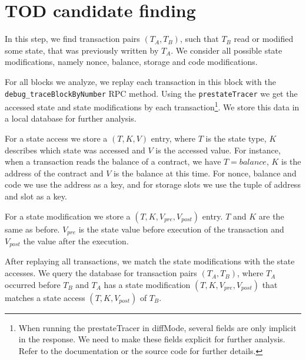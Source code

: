 \documentclass[draft,final]{vutinfth} %
\begin{document}

\section{TOD candidate finding}

In this step, we find transaction pairs $(T_A, T_B)$, such that $T_B$ read or modified some state, that was previously written by $T_A$. We consider all possible state modifications, namely nonce, balance, storage and code modifications.

For all blocks we analyze, we replay each transaction in this block with the \verb|debug_traceBlockByNumber| RPC method. Using the \verb|prestateTracer| we get the accessed state and state modifications by each transaction\footnote{When running the prestateTracer in diffMode, several fields are only implicit in the response. We need to make these fields explicit for further analysis. Refer to the documentation or the source code for further details.}. We store this data in a local database for further analysis.

For a state access we store a $(T, K, V)$ entry, where $T$ is the state type, $K$ describes which state was accessed and $V$ is the accessed value. For instance, when a transaction reads the balance of a contract, we have $T = balance$, $K$ is the address of the contract and $V$ is the balance at this time. For nonce, balance and code we use the address as a key, and for storage slots we use the tuple of address and slot as a key.

For a state modification we store a $(T, K, V_{pre}, V_{post})$ entry. $T$ and $K$ are the same as before. $V_{pre}$ is the state value before execution of the transaction and $V_{post}$ the value after the execution.

After replaying all transactions, we match the state modifications with the state accesses. We query the database for transaction pairs $(T_A, T_B)$, where $T_A$ occurred before $T_B$ and $T_A$ has a state modification $(T, K, V_{pre}, V_{post})$ that matches a state access $(T, K, V_{post})$ of $T_B$.


\iffalse
    Contrary to the definition of TOD, this does not necessarily mean, that the execution of $T_B$ yields a different result because of $T_A$. For instance if $T_A$ modifies storage value from $1$ to $2$ and $T_B$ loads this storage value without using it, there is no impact on $T_B$. \todo{this should go to the definition/general TOD discussion section}
\fi
\end{document}
